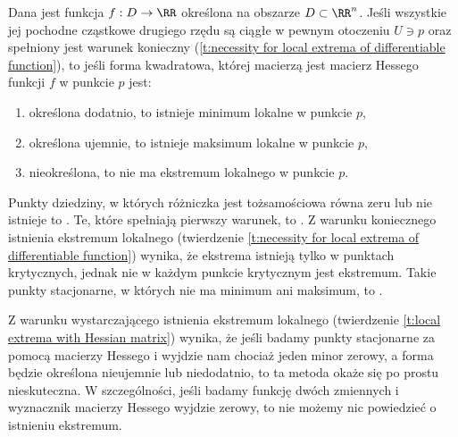 \begin{theorem}
    \label{t:local extrema with Hessian matrix}
    Dana jest funkcja $f : D \to \RR$ określona na obszarze $D \subset \RR^n$. Jeśli wszystkie jej pochodne cząstkowe drugiego rzędu są ciągłe w pewnym otoczeniu $U \ni p$ oraz spełniony jest warunek konieczny (\ref{t:necessity for local extrema of differentiable function}), to jeśli forma kwadratowa, której macierzą jest macierz Hessego funkcji $f$ w punkcie $p$ jest:
    \begin{enumerate}
        \item określona dodatnio, to istnieje minimum lokalne w punkcie $p$,
        \item określona ujemnie, to istnieje maksimum lokalne w punkcie $p$,
        \item nieokreślona, to nie ma ekstremum lokalnego w punkcie $p$.
    \end{enumerate}
\end{theorem}

\begin{remark}
    Punkty dziedziny, w których różniczka jest tożsamościowa równa zeru lub nie istnieje to . Te, które spełniają pierwszy warunek, to . Z warunku koniecznego istnienia ekstremum lokalnego (twierdzenie \ref{t:necessity for local extrema of differentiable function}) wynika, że ekstrema istnieją tylko w punktach krytycznych, jednak nie w każdym punkcie krytycznym jest ekstremum. Takie punkty stacjonarne, w których nie ma minimum ani maksimum, to .

    Z warunku wystarczającego istnienia ekstremum lokalnego (twierdzenie \ref{t:local extrema with Hessian matrix}) wynika, że jeśli badamy punkty stacjonarne za pomocą macierzy Hessego i wyjdzie nam chociaż jeden minor zerowy, a forma będzie określona nieujemnie lub niedodatnio, to ta metoda okaże się po prostu nieskuteczna. W szczególności, jeśli badamy funkcję dwóch zmiennych i wyznacznik macierzy Hessego wyjdzie zerowy, to nie możemy nic powiedzieć o istnieniu ekstremum.
\end{remark}

